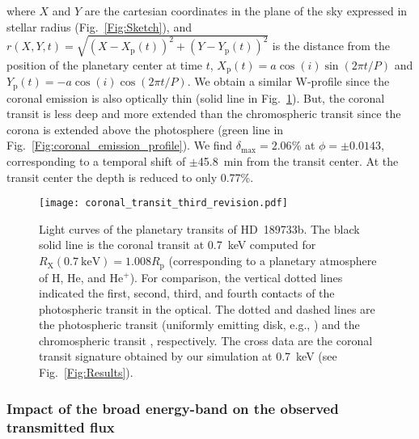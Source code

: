 \documentclass[iop]{emulateapj}
\begin{document}
where $X$ and $Y$ are the cartesian coordinates in the plane of the sky expressed in stellar radius (Fig.~\ref{Fig:Sketch}), 
and $r(X,Y,t)=\sqrt{(X-X_\mathrm{p}(t))^2+(Y-Y_\mathrm{p}(t))^2}$ is the distance from the position of the planetary center at time $t$, 
$X_\mathrm{p}(t)=a\cos(i)\sin(2\pi t/P)$ and $Y_\mathrm{p}(t)=-a\cos(i)\cos(2\pi t/P)$. We obtain a similar W-profile since the 
coronal emission is also optically thin (solid line in Fig.~\ref{Fig:Transit}). But, the coronal transit is less deep 
and more extended than the chromospheric transit since the corona is extended above the photosphere (green line in 
Fig.~\ref{Fig:coronal_emission_profile}). We find $\delta_\mathrm{max}=2.06\%$ at $\phi=\pm0.0143$, corresponding to a 
temporal shift of $\pm$45.8~min from the transit center. At the transit center the depth is reduced to only 0.77\%.

\begin{figure}[!t]
  \centering
  \texttt{[image: coronal\_transit\_third\_revision.pdf]}
  \caption{Light curves of the planetary transits of HD~189733b.
	  The black solid line is the coronal transit
	  at 0.7~keV computed for $R_\mathrm{X}(\mathrm{0.7~keV})=1.008R_\mathrm{p}$ 
	  (corresponding to a planetary atmosphere of H, He, 
	  and He$^+$). For comparison, the vertical dotted
	  lines indicated the first, second, third, and fourth contacts
	  of the photospheric transit in the optical. The 
	  dotted and dashed lines are the photospheric transit 
	  (uniformly emitting disk, e.g., \citealt{Mandel2002})  
	  and the chromospheric transit \citep{Schlawin2010}, respectively.
	  The cross data are the coronal transit signature obtained 
	  by our simulation at 0.7~keV (see Fig.~\ref{Fig:Results}).}
  \label{Fig:Transit}
\end{figure} 



\subsubsection{Impact of the broad energy-band on the observed transmitted flux}
\label{Sect:broad_band}
\end{document}
